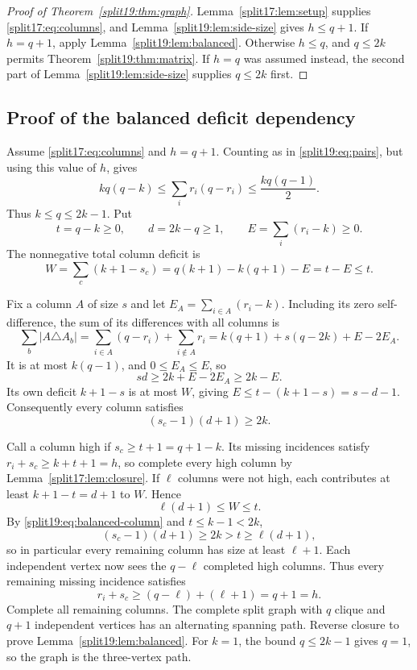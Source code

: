 \documentclass[11pt,a4paper]{article}
\theoremstyle{definition}\newtheorem{definition}[theorem]{Definition}
\theoremstyle{remark}\newtheorem{remark}[theorem]{Remark}
\begin{document}
\begin{proof}[Proof of Theorem~\ref{split19:thm:graph}]
Lemma~\ref{split17:lem:setup} supplies \eqref{split17:eq:columns}, and
Lemma~\ref{split19:lem:side-size} gives $h\le q+1$. If $h=q+1$, apply
Lemma~\ref{split19:lem:balanced}. Otherwise $h\le q$, and $q\le2k$ permits
Theorem~\ref{split19:thm:matrix}. If $h=q$ was assumed instead, the second part
of Lemma~\ref{split19:lem:side-size} supplies $q\le2k$ first.
\end{proof}

\subsection{Proof of the balanced deficit dependency}\label{split19:sec:balanced}
Assume \eqref{split17:eq:columns} and $h=q+1$. Counting as in
\eqref{split19:eq:pairs}, but using this value of $h$, gives
\[
 kq(q-k)\le\sum_i r_i(q-r_i)\le\frac{kq(q-1)}2.
\]
Thus $k\le q\le2k-1$. Put
\[
 t=q-k\ge0,\qquad d=2k-q\ge1,\qquad
 E=\sum_i(r_i-k)\ge0.
\]
The nonnegative total column deficit is
\begin{equation}\label{split19:eq:balanced-budget}
 W=\sum_c(k+1-s_c)=q(k+1)-k(q+1)-E=t-E\le t.
\end{equation}

Fix a column $A$ of size $s$ and let $E_A=\sum_{i\in A}(r_i-k)$.
Including its zero self-difference, the sum of its differences with all
columns is
\[
 \sum_b|A\triangle A_b|
 =\sum_{i\in A}(q-r_i)+\sum_{i\notin A}r_i
 =k(q+1)+s(q-2k)+E-2E_A.
\]
It is at most $k(q-1)$, and $0\le E_A\le E$, so
\[
 sd\ge2k+E-2E_A\ge2k-E.
\]
Its own deficit $k+1-s$ is at most $W$, giving
$E\le t-(k+1-s)=s-d-1$. Consequently every column satisfies
\begin{equation}\label{split19:eq:balanced-column}
 (s_c-1)(d+1)\ge2k.
\end{equation}

Call a column high if $s_c\ge t+1=q+1-k$. Its missing incidences satisfy
$r_i+s_c\ge k+t+1=h$, so complete every high column by
Lemma~\ref{split17:lem:closure}. If $\ell$ columns were not high, each contributes
at least $k+1-t=d+1$ to $W$. Hence
\[
 \ell(d+1)\le W\le t.
\]
By \eqref{split19:eq:balanced-column} and $t\le k-1<2k$,
\[
 (s_c-1)(d+1)\ge2k>t\ge\ell(d+1),
\]
so in particular every remaining column has size at least $\ell+1$.
Each independent vertex now sees the $q-\ell$ completed high columns.
Thus every remaining missing incidence satisfies
\[
 r_i+s_c\ge(q-\ell)+(\ell+1)=q+1=h.
\]
Complete all remaining columns. The complete split graph with $q$ clique
and $q+1$ independent vertices has an alternating spanning path.
Reverse closure to prove Lemma~\ref{split19:lem:balanced}. For $k=1$, the bound
$q\le2k-1$ gives $q=1$, so the graph is the three-vertex path.
\end{document}
